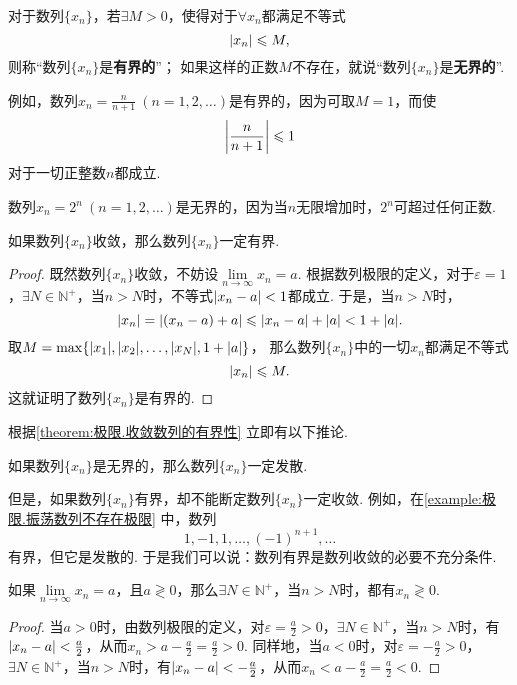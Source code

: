 \begin{definition}[数列的有界性]
对于数列\(\{x_n\}\)，若\(\exists M > 0\)，使得对于\(\forall x_n\)都满足不等式\[
\abs{x_n} \leqslant M,
\]则称“数列\(\{x_n\}\)是\textbf{有界的}”；
如果这样的正数\(M\)不存在，就说“数列\(\{x_n\}\)是\textbf{无界的}”.
\end{definition}
例如，数列\(x_n = \frac{n}{n+1}\ (n=1,2,\dotsc)\)是有界的，因为可取\(M=1\)，而使\[
\abs{\frac{n}{n+1}} \leqslant 1
\]对于一切正整数\(n\)都成立.

数列\(x_n = 2^n\ (n=1,2,\dotsc)\)是无界的，因为当\(n\)无限增加时，\(2^n\)可超过任何正数.

\begin{theorem}[收敛数列的有界性]\label{theorem:极限.收敛数列的有界性}
如果数列\(\{x_n\}\)收敛，那么数列\(\{x_n\}\)一定有界.
\begin{proof}
既然数列\(\{x_n\}\)收敛，不妨设\(\lim\limits_{n\to\infty}x_n = a\).
根据数列极限的定义，对于\(\varepsilon = 1\)，\(\exists N \in \mathbb{N}^+\)，当\(n > N\)时，不等式\(\abs{x_n - a} < 1\)都成立.
于是，当\(n > N\)时，\[
\abs{x_n} = \abs{(x_n - a) + a} \leqslant \abs{x_n - a} + \abs{a} < 1 + \abs{a}.
\]
取\(M = \max\{\abs{x_1},\abs{x_2},\dotsc,\abs{x_N},1+\abs{a}\}\)，%
那么数列\(\{x_n\}\)中的一切\(x_n\)都满足不等式\[
\abs{x_n} \leqslant M.
\]
这就证明了数列\(\{x_n\}\)是有界的.
\end{proof}
\end{theorem}

根据\cref{theorem:极限.收敛数列的有界性} 立即有以下推论.
\begin{corollary}
如果数列\(\{x_n\}\)是无界的，那么数列\(\{x_n\}\)一定发散.
\end{corollary}
但是，如果数列\(\{x_n\}\)有界，却不能断定数列\(\{x_n\}\)一定收敛.
例如，在\cref{example:极限.振荡数列不存在极限} 中，数列\[
1,-1,1,\dotsc,(-1)^{n+1},\dotsc
\]有界，但它是发散的.
于是我们可以说：数列有界是数列收敛的必要不充分条件.

\begin{theorem}[收敛数列的保号性]\label{theorem:极限.收敛数列的保号性}
如果\(\lim\limits_{n\to\infty}x_n = a\)，且\(a \gtrless 0\)，那么\(\exists N \in \mathbb{N}^+\)，当\(n > N\)时，都有\(x_n \gtrless 0\).
\begin{proof}
当\(a > 0\)时，由数列极限的定义，对\(\varepsilon = \frac{a}{2} > 0\)，\(\exists N \in \mathbb{N}^+\)，当\(n > N\)时，有\(\abs{x_n - a} < \frac{a}{2}\)，从而\(x_n > a - \frac{a}{2} = \frac{a}{2} > 0\).
同样地，当\(a < 0\)时，对\(\varepsilon = -\frac{a}{2} > 0\)，\(\exists N \in \mathbb{N}^+\)，当\(n > N\)时，有\(\abs{x_n - a} < -\frac{a}{2}\)，从而\(x_n < a - \frac{a}{2} = \frac{a}{2} < 0\).
\end{proof}
\end{theorem}

